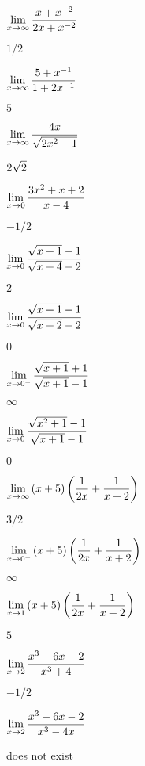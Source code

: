 \begin{exercises}
\exercise $\displaystyle\lim_{x\to\infty}{x+x^{-2}\over 2x+x^{-2}}$
\begin{answer} $1/2$
\end{answer}

\exercise $\displaystyle\lim_{x\to\infty}{5+x^{-1}\over 1+2x^{-1}}$
\begin{answer} $5$
\end{answer}

\exercise $\displaystyle\lim_{x\to\infty}{4x\over\sqrt{2x^2+1}}$
\begin{answer} $\displaystyle 2\sqrt2$
\end{answer}

\exercise $\displaystyle\lim_{x\to0}{3x^2+x+2\over x-4}$
\begin{answer} $-1/2$
\end{answer}

\exercise $\displaystyle\lim_{x\to0}{\sqrt{x+1}-1\over \sqrt{x+4}-2}$
\begin{answer} $2$
\end{answer}

\exercise $\displaystyle\lim_{x\to0}{\sqrt{x+1}-1\over \sqrt{x+2}-2}$
\begin{answer} $0$
\end{answer}

\exercise $\displaystyle\lim_{x\to0^+}{\sqrt{x+1}+1\over\sqrt{x+1}-1}$
\begin{answer} $\infty$
\end{answer}

\exercise $\displaystyle\lim_{x\to0}{\sqrt{x^2+1}-1\over\sqrt{x+1}-1}$
\begin{answer} $0$
\end{answer}

\exercise $\displaystyle\lim_{x\to\infty}{(x+5)\left({1\over 2x}+{1\over x+2}\right)}$
\begin{answer} $3/2$
\end{answer}

\exercise $\displaystyle\lim_{x\to0^+}{(x+5)\left({1\over 2x}+{1\over x+2}\right)}$
\begin{answer} $\infty$
\end{answer}

\exercise $\displaystyle\lim_{x\to1}{(x+5)\left({1\over 2x}+{1\over x+2}\right)}$
\begin{answer} $5$
\end{answer}

\exercise $\displaystyle\lim_{x\to2}{x^3-6x-2\over x^3+4}$
\begin{answer} $-1/2$
\end{answer}

\exercise $\displaystyle\lim_{x\to2}{x^3-6x-2\over x^3-4x}$
\begin{answer} does not exist
\end{answer}


\end{exercises}

